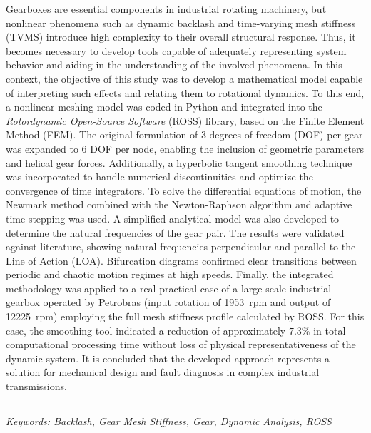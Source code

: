 Gearboxes are essential components in industrial rotating machinery, but nonlinear phenomena such as dynamic backlash and time-varying mesh stiffness (TVMS) introduce high complexity to their overall structural response. Thus, it becomes necessary to develop tools capable of adequately representing system behavior and aiding in the understanding of the involved phenomena. In this context, the objective of this study was to develop a mathematical model capable of interpreting such effects and relating them to rotational dynamics. To this end, a nonlinear meshing model was coded in Python and integrated into the \textit{Rotordynamic Open-Source Software} (ROSS) library, based on the Finite Element Method (FEM). The original formulation of 3 degrees of freedom (DOF) per gear was expanded to 6 DOF per node, enabling the inclusion of geometric parameters and helical gear forces. Additionally, a hyperbolic tangent smoothing technique was incorporated to handle numerical discontinuities and optimize the convergence of time integrators. To solve the differential equations of motion, the Newmark method combined with the Newton-Raphson algorithm and adaptive time stepping was used. A simplified analytical model was also developed to determine the natural frequencies of the gear pair. The results were validated against literature, showing natural frequencies perpendicular and parallel to the Line of Action (LOA). Bifurcation diagrams confirmed clear transitions between periodic and chaotic motion regimes at high speeds. Finally, the integrated methodology was applied to a real practical case of a large-scale industrial gearbox operated by Petrobras (input rotation of 1953~rpm and output of 12225~rpm) employing the full mesh stiffness profile calculated by ROSS. For this case, the smoothing tool indicated a reduction of approximately $7.3\%$ in total computational processing time without loss of physical representativeness of the dynamic system. It is concluded that the developed approach represents a solution for mechanical design and fault diagnosis in complex industrial transmissions.

\vspace*{\fill}
\noindent\rule{\textwidth}{1pt}
\textit{Keywords: Backlash, Gear Mesh Stiffness, Gear, Dynamic Analysis, ROSS}